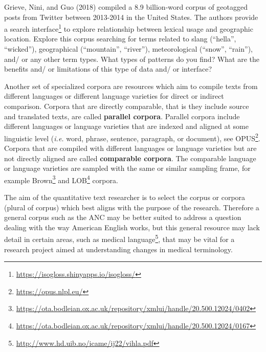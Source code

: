 \documentclass[
  letterpaper,
]{scrbook}
\DeclareRobustCommand{\href}[2]{#2\footnote{\url{#1}}}
\begin{document}
\begin{tcolorbox}[enhanced jigsaw, title=\textcolor{quarto-callout-important-color}{\faExclamation}\hspace{0.5em}{Consider}, breakable, colback=white, colframe=quarto-callout-important-color-frame, bottomrule=.15mm, left=2mm, bottomtitle=1mm, colbacktitle=quarto-callout-important-color!10!white, opacityback=0, arc=.35mm, toprule=.15mm, coltitle=black, leftrule=.75mm, opacitybacktitle=0.6, toptitle=1mm, titlerule=0mm, rightrule=.15mm]

Grieve, Nini, and Guo (2018) compiled a 8.9 billion-word corpus of
geotagged posts from Twitter between 2013-2014 in the United States. The
authors provide a \href{https://isogloss.shinyapps.io/isogloss/}{search
interface} to explore relationship between lexical usage and geographic
location. Explore this corpus searching for terms related to slang
(``hella'', ``wicked''), geographical (``mountain'', ``river''),
meteorological (``snow'', ``rain''), and/ or any other term types. What
types of patterns do you find? What are the benefits and/ or limitations
of this type of data and/ or interface?

\end{tcolorbox}

Another set of specialized corpora are resources which aim to compile
texts from different languages or different language varieties for
direct or indirect comparison. Corpora that are directly comparable,
that is they include source and translated texts, are called
\textbf{parallel corpora}. Parallel corpora include different languages
or language varieties that are indexed and aligned at some linguistic
level (\emph{i.e.} word, phrase, sentence, paragraph, or document), see
\href{https://opus.nlpl.eu/}{OPUS}. Corpora that are compiled with
different languages or language varieties but are not directly aligned
are called \textbf{comparable corpora}. The comparable language or
language varieties are sampled with the same or similar sampling frame,
for example
\href{https://ota.bodleian.ox.ac.uk/repository/xmlui/handle/20.500.12024/0402}{Brown}
and
\href{https://ota.bodleian.ox.ac.uk/repository/xmlui/handle/20.500.12024/0167}{LOB}
corpora.

The aim of the quantitative text researcher is to select the corpus or
corpora (plural of corpus) which best aligns with the purpose of the
research. Therefore a general corpus such as the ANC may be better
suited to address a question dealing with the way American English
works, but this general resource may lack detail in certain areas, such
as \href{http://www.hd.uib.no/icame/ij22/vihla.pdf}{medical language},
that may be vital for a research project aimed at understanding changes
in medical terminology.
\end{document}
